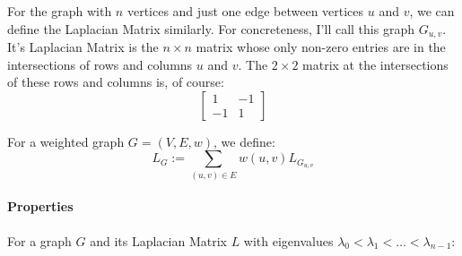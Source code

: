 For the graph with $n$ vertices and just one edge between vertices $u$ and $v$, 
we can define the Laplacian Matrix similarly. For concreteness, I'll call this
graph $G_{u,v}$. It's Laplacian Matrix is the $n{\times}n$ matrix whose only 
non-zero entries are in the intersections of rows and columns $u$ and $v$. The 
$2{\times}2$ matrix at the intersections of these rows and columns is, of 
course:
\begin{displaymath}
    \begin{bmatrix}
        1 & -1 \\
        -1 & 1
    \end{bmatrix}
\end{displaymath}

For a weighted graph $G = (V,E,w)$, we define:
\begin{displaymath}
L_{G} := \sum_{(u,v) \in E} w(u,v)L_{G_{u,v}}
\end{displaymath}

\paragraph{Properties}
For a graph $G$ and its Laplacian Matrix $L$ with eigenvalues $\lambda_{0} < 
\lambda_{1} < \ldots < \lambda_{n-1}$:

